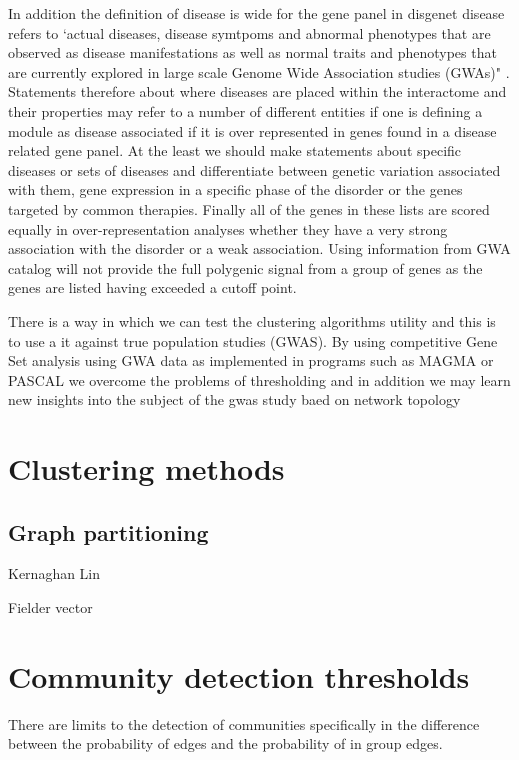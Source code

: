 In addition the definition of disease is wide for the gene panel in disgenet disease refers to `actual diseases, disease symtpoms and abnormal phenotypes that are observed as disease manifestations as well as normal traits and phenotypes that are currently explored in large scale Genome Wide Association studies (GWAs)" \cite{pinero2020disgenet}. Statements therefore about where diseases are placed within the interactome \cite{barabasi2016network}  and their properties may refer to a number of different entities if one is defining a module as disease associated if it is over represented in genes found in a disease related gene panel. At the least we should make statements about specific diseases or sets of diseases and differentiate between genetic variation associated with them, gene expression in a specific phase of the disorder or the genes targeted by common therapies. Finally all of the genes in these lists are scored equally in over-representation analyses whether they have a very strong association with the disorder or a weak association. Using information from GWA catalog will not provide the full polygenic signal from a group of genes as the genes are listed having exceeded a cutoff point. 

There is a way in which we can test the clustering algorithms utility and this is to use a it against true population studies (GWAS). By using competitive Gene Set analysis using GWA data as implemented in programs such as MAGMA \cite{de2015magma} or PASCAL \cite{lamparter2016fast} we overcome the problems of thresholding and in addition we may learn new insights into the subject of the gwas study baed on network topology 


\section{Clustering methods}

\subsection{Graph partitioning}
Kernaghan Lin

Fielder vector
 \section{Community detection thresholds}
There are limits to the detection of communities specifically in the difference between the probability of edges and the probability of in group edges.

